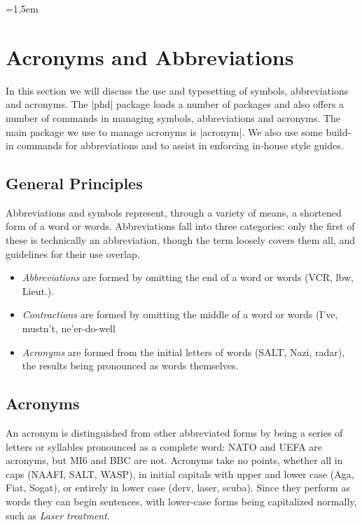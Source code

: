 \parindent=1.5em



\chapter{Acronyms and Abbreviations}


In this section we will discuss the use and typesetting of symbols, abbreviations and acronyms. The |phd| package loads a number of packages and also offers a number of commands in managing symbols, abbreviations and acronyms. The main package we use to manage acronyms is |acronym|. We also use some build-in commands for abbreviations and to assist in enforcing in-house style guides.

\section{General Principles}

Abbreviations and symbols represent, through a variety of means, a
shortened form of a word or words. Abbreviations fall into three categories:
only the first of these is technically an abbreviation, though the
term loosely covers them all, and guidelines for their use overlap.

\begin{itemize}
\item \textit{Abbreviations} are formed by omitting the end of a word or words (VCR, lbw, Lieut.).
\item \textit{Contractions} are formed by omitting the middle of a word or words (I've,
mustn't, ne'er-do-well
\item \textit{Acronyms} are formed from the initial letters of words (SALT, Nazi, radar), the results being pronounced as words themselves.
\end{itemize}

\section{Acronyms}

An acronym is distinguished from other abbreviated forms by being a series of letters or syllables pronounced as a complete word: \textsc{NATO}
and UEFA are acronyms, but MI6 and BBC are not. Acronyms take no
points, whether all in caps (NAAFI, SALT, WASP), in initial capitals with
upper and lower case (Aga, Fiat, Sogat), or entirely in lower case (derv,
laser, scuba). Since they perform as words they can begin sentences, with
lower-case forms being capitalized normally, such as \textit{Laser treatment}. 

